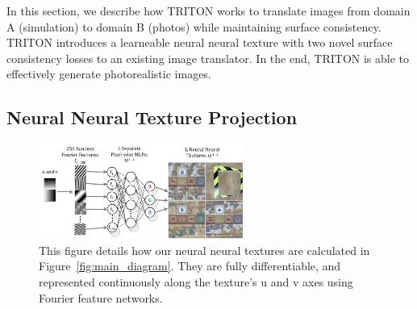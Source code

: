 \documentclass{article}
\begin{document}
		In this section, we describe how TRITON works to translate images from domain A (simulation) to domain B (photos) while maintaining surface consistency. 
		TRITON introduces a learneable neural neural texture with two novel surface consistency losses to an existing image translator. In the end, TRITON is able to effectively generate photorealistic images.
\vspace{-3pt}
	\subsection{Neural Neural Texture Projection}
	\label{sec:neural_tex}
	\vspace{-3pt}
		\begin{figure}[thbp]
		    \vspace{-5pt}
			\begin{center}
				\includegraphics[width=0.6\textwidth]{../images/learnable_textures.pdf}
			\end{center}
			\vspace{-3pt}
			\caption{
				This figure details how our neural neural textures are calculated in Figure~\ref{fig:main_diagram}. They are fully differentiable, and represented continuously along the texture's u and v axes using Fourier feature networks.
			}
			\vspace{-10pt}
			\label{fig:learnable_textures}
		\end{figure}

\end{document}
